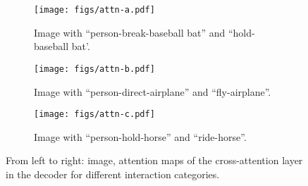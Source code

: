 \documentclass[10pt,twocolumn,letterpaper]{article}
\begin{document}
\begin{figure}
  \centering
  \begin{subfigure}{\linewidth}
    \texttt{[image: figs/attn-a.pdf]}
    \caption{Image with ``person-break-baseball bat'' and ``hold-baseball bat'.}
    \label{fig:attn-a}
  \end{subfigure}
  \hfill
  \begin{subfigure}{\linewidth}
    \texttt{[image: figs/attn-b.pdf]}
    \caption{Image with ``person-direct-airplane'' and ``fly-airplane''.}
    \label{fig:attn-b}
  \end{subfigure}
  \hfill
  \begin{subfigure}{\linewidth}
    \texttt{[image: figs/attn-c.pdf]}
    \caption{Image with ``person-hold-horse'' and ``ride-horse''.}
    \label{fig:attn-c}
  \end{subfigure}
  \caption{From left to right: image, attention maps of the cross-attention layer in the decoder for different interaction categories.}
  \vspace{-8pt}
  \label{fig:attn}
\end{figure}
\end{document}
